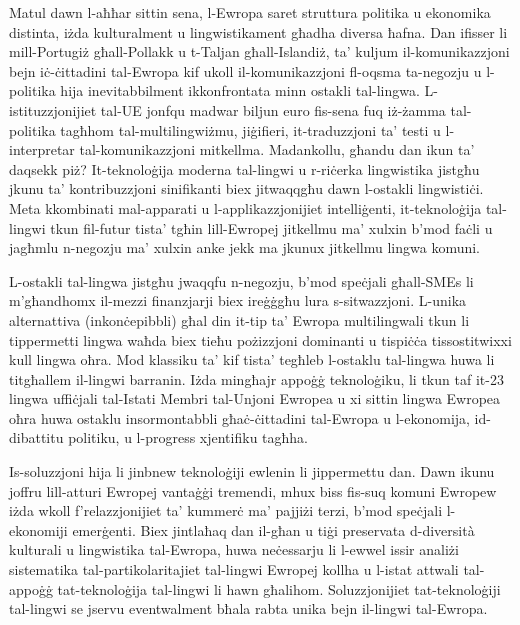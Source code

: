 \documentclass[]{../../metanetpaper}
\begin{document}
\begin{multicols}{2}
Matul dawn l-aħħar sittin sena, l-Ewropa saret struttura politika u ekonomika distinta, iżda kulturalment u lingwistikament għadha diversa ħafna. Dan ifisser li mill-Portugiż għall-Pollakk u t-Taljan għall-Islandiż, ta’ kuljum il-komunikazzjoni bejn iċ-ċittadini tal-Ewropa kif ukoll il-komunikazzjoni fl-oqsma ta-negozju u l-politika hija inevitabbilment ikkonfrontata minn ostakli tal-lingwa. L-istituzzjonijiet tal-UE jonfqu madwar biljun euro fis-sena fuq iż-żamma tal-politika tagħhom tal-multilingwiżmu, jiġifieri, it-traduzzjoni ta’ testi u l-interpretar tal-komunikazzjoni mitkellma. Madankollu, għandu dan ikun ta’ daqsekk piż? It-teknoloġija moderna tal-lingwi u r-riċerka lingwistika jistgħu jkunu ta’ kontribuzzjoni sinifikanti biex jitwaqqgħu dawn l-ostakli lingwistiċi. Meta kkombinati mal-apparati u l-applikazzjonijiet intelliġenti, it-teknoloġija tal-lingwi tkun fil-futur tista’ tgħin lill-Ewropej jitkellmu ma’ xulxin b’mod faċli u jagħmlu n-negozju ma’ xulxin anke jekk ma jkunux jitkellmu lingwa komuni.


L-ostakli tal-lingwa jistgħu jwaqqfu n-negozju, b’mod speċjali għall-SMEs li m’għandhomx il-mezzi finanzjarji biex ireġġgħu lura s-sitwazzjoni. L-unika alternattiva (inkonċepibbli) għal din it-tip ta’ Ewropa multilingwali tkun li tippermetti lingwa waħda biex tieħu pożizzjoni dominanti u tispiċċa tissostitwixxi kull lingwa oħra. 
Mod klassiku ta’ kif tista’ tegħleb l-ostaklu tal-lingwa huwa li titgħallem il-lingwi barranin. Iżda mingħajr appoġġ teknoloġiku, li tkun taf it-23 lingwa uffiċjali tal-Istati Membri tal-Unjoni Ewropea u xi sittin lingwa Ewropea oħra huwa ostaklu insormontabbli għaċ-ċittadini tal-Ewropa u l-ekonomija, id-dibattitu politiku, u l-progress xjentifiku tagħha.
   
Is-soluzzjoni hija li jinbnew teknoloġiji ewlenin li jippermettu dan. Dawn ikunu joffru lill-atturi Ewropej vantaġġi tremendi, mhux biss fis-suq komuni Ewropew iżda wkoll f’relazzjonijiet ta’ kummerċ ma’ pajjiżi terzi, b’mod speċjali l-ekonomiji emerġenti. Biex jintlaħaq dan il-għan u tiġi preservata d-diversità kulturali u lingwistika tal-Ewropa, huwa neċessarju li l-ewwel issir analiżi sistematika tal-partikolaritajiet tal-lingwi Ewropej kollha u l-istat attwali tal-appoġġ tat-teknoloġija tal-lingwi li hawn għalihom. Soluzzjonijiet tat-teknoloġiji tal-lingwi se jservu eventwalment bħala rabta unika bejn il-lingwi tal-Ewropa.


\end{multicols}
\end{document}
